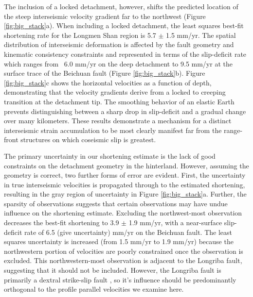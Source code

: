 \documentclass[12pt]{article}
\begin{document}
The inclusion of a locked detachment, however, shifts the predicted location of the steep interseismic velocity gradient far to the northwest (Figure \ref{fig:big_stack}a). When including a locked detachment, the least squares best-fit shortening rate for the Longmen Shan region is 5.7 $\pm$ 1.5 mm/yr. The spatial distribution of interseismic deformation is affected by the fault geometry and kinematic consistency constraints and represented in terms of the slip-deficit rate which ranges from ~6.0 mm/yr on the deep detachment to 9.5 mm/yr at the surface trace of the Beichuan fault (Figure \ref{fig:big_stack}b). Figure \ref{fig:big_stack}c shows the horizontal velocities as a function of depth, demonstrating that the velocity gradients derive from a locked to creeping transition at the detachment tip. The smoothing behavior of an elastic Earth prevents distinguishing between a sharp drop in slip-deficit and a gradual change over many kilometers. These results demonstrate a mechanism for a distinct interseismic strain accumulation to be most clearly manifest far from the range-front structures on which coseismic slip is greatest.

The primary uncertainty in our shortening estimate is the lack of good constraints on the detachment geometry in the hinterland. However, assuming the geometry is correct, two further forms of error are evident. First, the uncertainty in true interseismic velocities is propagated through to the estimated shortening, resulting in the gray region of uncertainty in Figure \ref{fig:big_stack}a. Further, the sparsity of observations suggests that certain observations may have undue influence on the shortening estimate. Excluding the northwest-most observation decreases the best-fit shortening to 3.9 $\pm$ 1.9 mm/yr, with a near-surface slip-deficit rate of 6.5 (give uncertainty) mm/yr on the Beichuan fault. The least squares uncertainty is increased (from 1.5 mm/yr to 1.9 mm/yr) because the northwestern portion of velocities are poorly constrained once the observation is excluded. This northwestern-most observation is adjacent to the Longriba fault, suggesting that it should not be included. However, the Longriba fault is primarily a dextral strike-slip fault \citep{Ren2013}, so it's influence should be predominantly orthogonal to the profile parallel velocities we examine here.
\end{document}
